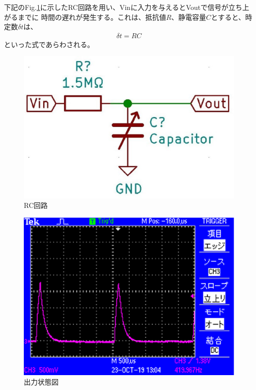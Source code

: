 下記のFig.\ref{RC}に示したRC回路を用い、Vinに入力を与えるとVoutで信号が立ち上がるまでに
時間の遅れが発生する。これは、抵抗値$R$、静電容量$C$とすると、時定数$\delta t$は、
\begin{eqnarray}
    \delta t = RC
\end{eqnarray}
といった式であらわされる。

\begin{figure}[h]
 \begin{center}
  \includegraphics[width=0.5\columnwidth,clip]{./2_measurement/RC.eps}
  \caption{RC回路}
  \label{RC}
 \end{center}
\end{figure}

\begin{figure}[h]
    \begin{center}
     \includegraphics[width=0.5\columnwidth,clip]{./2_measurement/oscilloscope.eps}
     \caption{出力状態図}
     \label{オシロスコープ}
    \end{center}
\end{figure}

